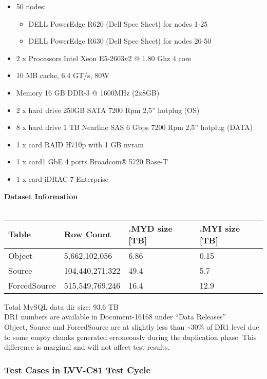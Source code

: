 \documentclass[DM,lsstdraft,STR,toc]{lsstdoc}
\providecommand{\tightlist}{
  \setlength{\itemsep}{0pt}\setlength{\parskip}{0pt}}
\begin{document}
\begin{itemize}
\tightlist
\item
  50 nodes:

  \begin{itemize}
  \tightlist
  \item
    DELL PowerEdge R620 (Dell Spec Sheet) for nodes 1-25~
  \item
    DELL PowerEdge R630 (Dell Spec Sheet) for nodes 26-50
  \end{itemize}
\item
  2 x Processors Intel Xeon E5-2603v2 @ 1.80 Ghz 4 core
\item
  10 MB cache, 6.4 GT/s, 80W
\item
  Memory 16 GB DDR-3 @ 1600MHz (2x8GB)
\item
  2 x hard drive 250GB SATA 7200 Rpm 2,5'' hotplug (OS)
\item
  8 x hard drive 1 TB Nearline SAS 6 Gbps 7200 Rpm 2,5'' hotplug (DATA)
\item
  1 x card RAID H710p with 1 GB nvram
\item
  1 x card1 GbE 4 ports Broadcom® 5720 Base-T
\item
  1 x card iDRAC 7 Enterprise
\end{itemize}

\textbf{Dataset Information\\
}\\

\begin{longtable}[]{@{}llll@{}}
\toprule
Table & Row Count & .MYD size {[}TB{]} & .MYI size
{[}TB{]}\tabularnewline
\midrule
\endhead
Object & 5,662,102,056 & 6.86 & 0.15\tabularnewline
Source & 104,440,271,322 & 49.4 & 5.7\tabularnewline
ForcedSource & 515,549,769,246 & 16.4 & 12.9\tabularnewline
\bottomrule
\end{longtable}

Total MySQL data dir size: 93.6 TB\\[2\baselineskip]DR1 numbers are
available in Document-16168 under ``Data
Releases''\\[2\baselineskip]Object, Source and ForcedSource are at
slightly less than \textasciitilde{}30\% of DR1 level due to some empty
chunks generated erroneously during the duplication phase. This
difference is marginal and will not affect test results.


  \subsubsection{Test Cases in LVV-C81 Test Cycle}
\end{document}
